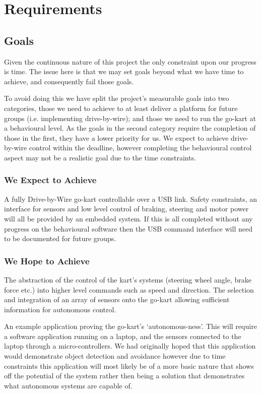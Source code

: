 \chapter{Requirements}
\section{Goals}
Given the continuous nature of this project the only constraint upon our progress is time. The issue here is that we may set goals beyond what we have time to achieve, and consequently fail those goals.

To avoid doing this we have split the project's measurable goals into two categories, those we need to achieve to at least deliver a platform for future groups (i.e. implementing drive-by-wire); and those we need to run the go-kart at a behavioural level. As the goals in the second category require the completion of those in the first, they have a lower priority for us. We expect to achieve drive-by-wire control within the deadline, however completing the behavioural control aspect may not be a realistic goal due to the time constraints.

\subsection{We Expect to Achieve}
A fully Drive-by-Wire go-kart controllable over a USB link. Safety constraints, an interface for sensors and low level control of braking, steering and motor power will all be provided by an embedded system. If this is all completed without any progress on the behavioural software then the USB command interface will need to be documented for future groups.

\subsection{We Hope to Achieve}
The abstraction of the control of the kart's systems (steering wheel angle, brake force etc.) into higher level commands such as speed and direction. The selection and integration of an array of sensors onto the go-kart allowing sufficient information for autonomous control.

An example application proving the go-kart's `autonomous-ness'. This will require a software application running on a laptop, and the sensors connected to the laptop through a micro-controllers. We had originally hoped that this application would demonstrate object detection and avoidance however due to time constraints this application will most likely be of a more basic nature that shows off the potential of the system rather then being a solution that demonstrates what autonomous systems are capable of.

